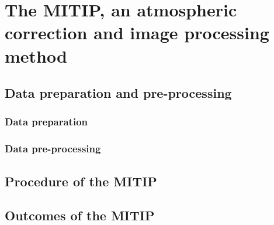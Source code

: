\chapter{The MITIP, an atmospheric correction and image processing method}

\label{Chapter3}




\section{Data preparation and pre-processing}


\subsection{Data preparation}



\subsection{Data pre-processing}


\section{Procedure of the MITIP}



\section{Outcomes of the MITIP}
